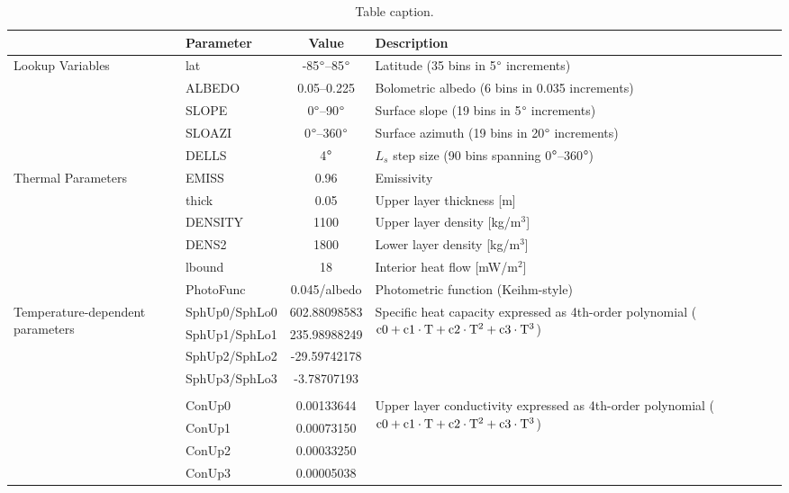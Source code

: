 \begin{table}[htb]
\caption{Table caption.}
\centering
\begin{tabular}{l l c l}
\hline
& Parameter & Value & Description  \\
\hline
\multirow{5}{6em}{Lookup Variables}
 & lat  & -85$\degree$--85$\degree$ & Latitude (35 bins in 5$\degree$ increments)  \\
 & ALBEDO  & 0.05--0.225 & Bolometric albedo (6 bins in 0.035 increments)  \\
 & SLOPE  & 0$\degree$--90$\degree$ & Surface slope (19 bins in 5$\degree$ increments)   \\
 & SLOAZI  & 0$\degree$--360$\degree$ & Surface azimuth (19 bins in 20$\degree$ increments)   \\
 & DELLS  & 4$\degree$ & $L_s$ step size (90 bins spanning 0$\degree$--360$\degree$) \\
\hline
\multirow{8}{6em}{Thermal Parameters}
 & EMISS  & 0.96 & Emissivity  \\
 & thick  & 0.05 & Upper layer thickness [m] \\
 & DENSITY  & 1100 & Upper layer density [kg/m$^3$]  \\
 & DENS2  & 1800 & Lower layer density [kg/m$^3$]  \\
 & lbound  & 18 & Interior heat flow [mW/m$^2$]   \\
 & \multirow{3}{*}{PhotoFunc}  & \multirow{3}{*}{0.045/albedo} & \multirow{3}{20em}{Photometric function (Keihm-style)} \\
 & & & \\
 & & & \\
\hline
\multirow{12}{6em}{Temperature-dependent parameters}
 & SphUp0/SphLo0  & 602.88098583 & \multirow{4}{20em}{Specific heat capacity expressed as 4th-order polynomial ($\rm c0 + c1 \cdot T + c2 \cdot T^2 + c3 \cdot T^3$)} \\
 & SphUp1/SphLo1  & 235.98988249 &  \\
 & SphUp2/SphLo2  & -29.59742178 &  \\
 & SphUp3/SphLo3  & -3.78707193  & \\
 \\
 & ConUp0  & 0.00133644 &  \multirow{4}{20em}{Upper layer conductivity expressed as 4th-order polynomial ($\rm c0 + c1 \cdot T + c2 \cdot T^2 + c3 \cdot T^3$)} \\
 & ConUp1  & 0.00073150 &  \\
 & ConUp2  & 0.00033250 &  \\
 & ConUp3  & 0.00005038 &  \\

\end{tabular}
\end{table}
